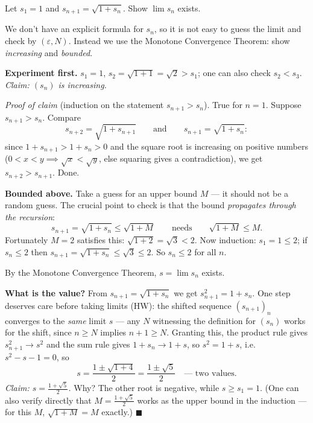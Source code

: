 \documentclass[11pt]{report}
\begin{document}
\begin{exbox}
Let $s_1 = 1$ and $s_{n+1} = \sqrt{1 + s_n}$. Show $\lim s_n$ exists.

We don't have an explicit formula for $s_n$, so it is not easy to guess the limit and check by $(\varepsilon, N)$. Instead we use the Monotone Convergence Theorem: show \emph{increasing} and \emph{bounded}.

\textbf{Experiment first.} $s_1 = 1$, $s_2 = \sqrt{1+1} = \sqrt2 > s_1$; one can also check $s_2 < s_3$. \emph{Claim: $(s_n)$ is increasing.}

\emph{Proof of claim} (induction on the statement $s_{n+1} > s_n$). True for $n = 1$. Suppose $s_{n+1} > s_n$. Compare
\[
s_{n+2} = \sqrt{1 + s_{n+1}} \qquad \text{and} \qquad s_{n+1} = \sqrt{1 + s_n}:
\]
since $1 + s_{n+1} > 1 + s_n > 0$ and the square root is increasing on positive numbers ($0 < x < y \implies \sqrt{x} < \sqrt{y}$, else squaring gives a contradiction), we get $s_{n+2} > s_{n+1}$. Done.

\textbf{Bounded above.} Take a guess for an upper bound $M$ --- it should not be a random guess. The crucial point to check is that the bound \emph{propagates through the recursion}:
\[
s_{n+1} = \sqrt{1 + s_n} \leq \sqrt{1 + M} \qquad \text{needs} \qquad \sqrt{1 + M} \leq M.
\]
Fortunately $M = 2$ satisfies this: $\sqrt{1+2} = \sqrt3 < 2$. Now induction: $s_1 = 1 \leq 2$; if $s_n \leq 2$ then $s_{n+1} = \sqrt{1+s_n} \leq \sqrt3 \leq 2$. So $s_n \leq 2$ for all $n$.

By the Monotone Convergence Theorem, $s = \lim s_n$ exists.

\textbf{What is the value?} From $s_{n+1} = \sqrt{1 + s_n}$ we get $s_{n+1}^2 = 1 + s_n$. One step deserves care before taking limits (HW): the shifted sequence $(s_{n+1})_n$ converges to the \emph{same} limit $s$ --- any $N$ witnessing the definition for $(s_n)$ works for the shift, since $n \geq N$ implies $n + 1 \geq N$. Granting this, the product rule gives $s_{n+1}^2 \to s^2$ and the sum rule gives $1 + s_n \to 1 + s$, so $s^2 = 1 + s$, i.e.\ $s^2 - s - 1 = 0$, so
\[
s = \frac{1 \pm \sqrt{1 + 4}}{2} = \frac{1 \pm \sqrt5}{2} \quad \text{--- two values.}
\]
\emph{Claim: $s = \tfrac{1 + \sqrt5}{2}$.} Why? The other root is negative, while $s \geq s_1 = 1$. (One can also verify directly that $M = \tfrac{1+\sqrt5}{2}$ works as the upper bound in the induction --- for this $M$, $\sqrt{1 + M} = M$ exactly.) \hfill $\blacksquare$
\end{exbox}
\end{document}
